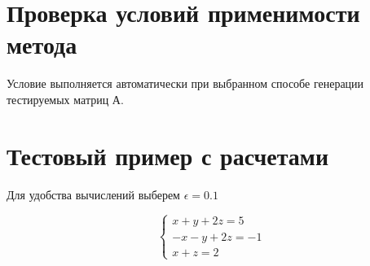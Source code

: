 \documentclass[12pt]{article}
\begin{document}
\section{Проверка условий применимости метода}
Условие выполняется автоматически при выбранном способе  генерации тестируемых матриц А.
\section{Тестовый пример с расчетами}
Для удобства вычислений выберем $\epsilon = 0.1$

\begin{equation*}
 \begin{cases}
   x + y + 2z = 5 
   \\
   -x -y +2z = -1
   \\
   x + z = 2
 \end{cases}
\end{equation*}
\end{document}
